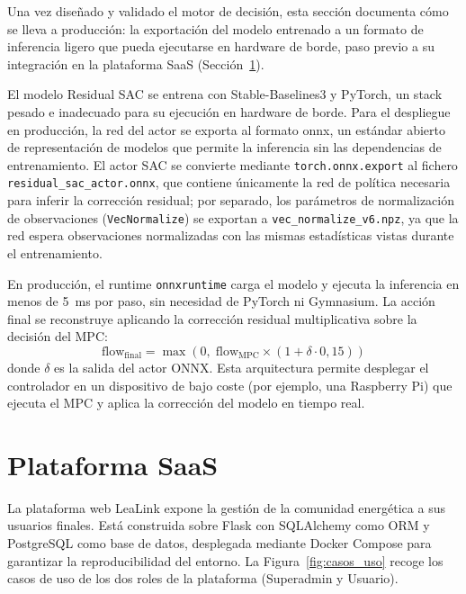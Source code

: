 \documentclass[12pt, a4paper, twoside]{report}
\begin{document}
Una vez diseñado y validado el motor de decisión, esta sección documenta cómo
se lleva a producción: la exportación del modelo entrenado a un formato de
inferencia ligero que pueda ejecutarse en hardware de borde, paso previo a su
integración en la plataforma SaaS (Sección~\ref{sec:saas}).

El modelo Residual SAC se entrena con Stable-Baselines3 y PyTorch, un stack
pesado e inadecuado para su ejecución en hardware de borde. Para el despliegue
en producción, la red del actor se exporta al formato \acrfull{onnx}, un
estándar abierto de representación de modelos que permite la inferencia sin las
dependencias de entrenamiento. El actor SAC se convierte mediante
\texttt{torch.onnx.export} al fichero \texttt{residual\_sac\_actor.onnx}, que
contiene únicamente la red de política necesaria para inferir la corrección
residual; por separado, los parámetros de normalización de observaciones
(\texttt{VecNormalize}) se exportan a \texttt{vec\_normalize\_v6.npz}, ya que la
red espera observaciones normalizadas con las mismas estadísticas vistas durante
el entrenamiento.

En producción, el runtime \texttt{onnxruntime} carga el modelo y ejecuta la
inferencia en menos de \SI{5}{ms} por paso, sin necesidad de PyTorch ni
Gymnasium. La acción final se reconstruye aplicando la corrección residual
multiplicativa sobre la decisión del MPC:
\begin{equation}
  \text{flow}_{\text{final}} = \max\!\left(0,\;
  \text{flow}_{\text{MPC}} \times (1 + \delta \cdot 0{,}15)\right)
  \label{eq:onnx_residual}
\end{equation}
donde $\delta$ es la salida del actor ONNX. Esta arquitectura permite desplegar
el controlador en un dispositivo de bajo coste (por ejemplo, una Raspberry Pi)
que ejecuta el MPC y aplica la corrección del modelo en tiempo real.

\section{Plataforma SaaS}
\label{sec:saas}

La plataforma web LeaLink expone la gestión de la comunidad energética a sus
usuarios finales. Está construida sobre Flask con SQLAlchemy como ORM y
PostgreSQL como base de datos, desplegada mediante Docker Compose para
garantizar la reproducibilidad del entorno. La Figura~\ref{fig:casos_uso} recoge
los casos de uso de los dos roles de la plataforma (Superadmin y Usuario).
\end{document}
